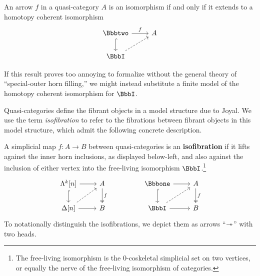    \begin{cor}\label{cor:coherent-iso} An arrow $f$ in a quasi-category $A$ is an isomorphism if and only if it extends to a homotopy coherent isomorphism
   \[
   \begin{tikzcd} \cattwo \arrow[r, "f"] \arrow[d, hook] & A \\ \iso \arrow[ur, dashed]
   \end{tikzcd}
   \]
   \end{cor}

 \begin{rmk}
If this result proves too annoying to formalize without the general theory of ``special-outer horn filling,'' we might instead substitute a finite model of the homotopy coherent isomorphism for $\iso$.
 \end{rmk}



 Quasi-categories define the fibrant objects in a model structure due to Joyal. We use the term \emph{isofibration} to refer to the fibrations between fibrant objects in this model structure, which admit the following concrete description.

 \begin{defn}[isofibration]\label{defn:qcat-isofibration} A simplicial map $f \colon A \to B$ between quasi-categories is an \textbf{isofibration} if it lifts against the inner horn inclusions, as displayed below-left, and also against the inclusion of either vertex into the free-living isomorphism $\iso$.\footnote{The free-living isomorphism is the 0-coskeletal simplicial set on two vertices, or equally the nerve of the free-living isomorphism of categories.}
  \[
  \begin{tikzcd}
  \Lambda^k[n] \arrow[d, hook] \arrow[r] &  A \arrow[d, two heads, "f"] & &  \catone \arrow[d, hook] \arrow[r] & A \arrow[d, two heads, "f"] \\ \Delta[n] \arrow[ur, dashed] \arrow[r] & B & &  \iso \arrow[ur, dashed] \arrow[r] & B
  \end{tikzcd}
  \]
  To notationally distinguish the isofibrations, we depict them as arrows ``$\twoheadrightarrow$'' with two heads.
\end{defn}

